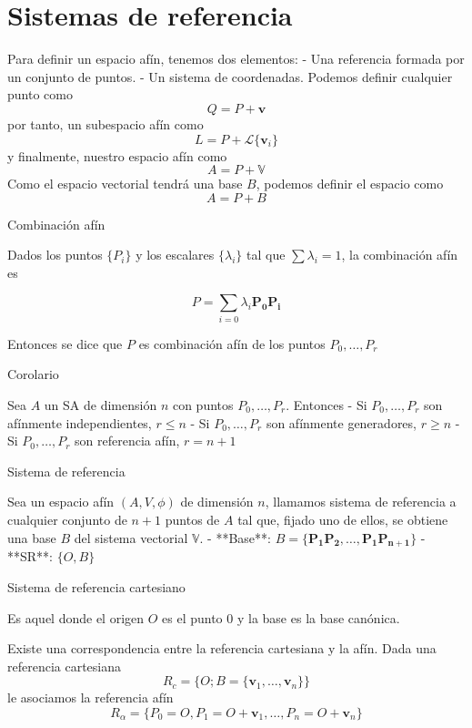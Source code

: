 \documentclass{./Geometria.tex}
\begin{document}
\chapter{Sistemas de referencia}
Para definir un espacio afín, tenemos dos elementos:
- Una referencia formada por un conjunto de puntos.
- Un sistema de coordenadas.
Podemos definir cualquier punto como
$$
Q=P+\mathbf{v}
$$
por tanto, un subespacio afín como
$$
L=P+\mathcal{L}\{ \mathbf{v}_{i} \}
$$
y finalmente, nuestro espacio afín como
$$
A=P+\mathbb{V}
$$
Como el espacio vectorial tendrá una base $B$, podemos definir el espacio como
$$
A=P+B
$$

\begin{defin}
Combinación afín

Dados los puntos $\{ P_{i} \}$ y los escalares $\{ \lambda_{i} \}$ tal que $\sum\lambda_{i}=1$, la combinación afín es

$$
P=\sum_{i=0} \lambda_{i} \mathbf{P_{0}P_{i}}
$$

Entonces se dice que $P$ es combinación afín de los puntos $P_{0},\dots,P_{r}$
\end{defin}

\begin{teorema}
Corolario

Sea $A$ un SA de dimensión $n$ con puntos $P_{0},\dots,P_{r}$. Entonces
- Si $P_{0},\dots,P_{r}$  son afínmente independientes, $r \leq n$
- Si $P_{0},\dots,P_{r}$ son afínmente generadores, $r \geq n$
- Si $P_{0},\dots,P_{r}$ son referencia afín, $r=n+1$
\end{teorema}

\begin{teorema}
Sistema de referencia

Sea un espacio afín $(A,V,\phi)$ de dimensión $n$, llamamos sistema de referencia a cualquier conjunto de $n+1$ puntos de $A$ tal que, fijado uno de ellos, se obtiene una base $B$ del sistema vectorial $\mathbb{V}$.
- **Base**: $B=\{ \mathbf{P_{1}P_{2}},\dots,\mathbf{P_{1}P_{n+1}} \}$
- **SR**: $\{ O,B \}$
\end{teorema}

\begin{teorema}
Sistema de referencia cartesiano

Es aquel donde el origen $O$ es el punto $0$ y la base es la base canónica.
\end{teorema}

Existe una correspondencia entre la referencia cartesiana y la afín. Dada una referencia cartesiana
$$
R_{c}=\{ O;B=\{ \mathbf{v}_{1},\dots,\mathbf{v}_{n} \} \}
$$
le asociamos la referencia afín
$$
R_{\alpha}=\{ P_{0}=O,P_{1}=O+\mathbf{v}_{1},\dots,P_{n}=O+\mathbf{v}_{n} \}
$$
\end{document}
